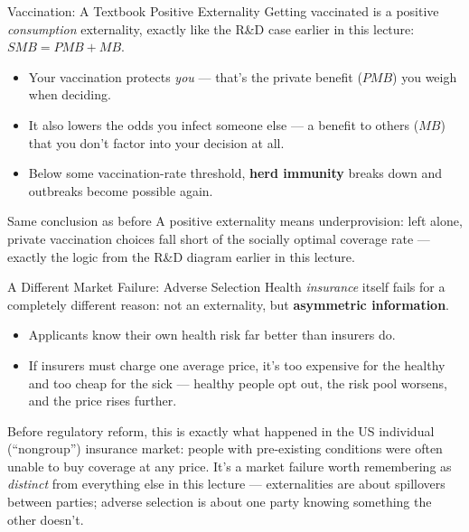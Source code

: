 \documentclass[11pt,aspectratio=169]{beamer}
\begin{document}
\begin{frame}{Vaccination: A Textbook Positive Externality}
  Getting vaccinated is a positive \emph{consumption} externality, exactly like the R\&D case earlier in this lecture: $SMB = PMB + MB$.
  \begin{itemize}
    \item Your vaccination protects \emph{you} --- that's the private benefit ($PMB$) you weigh when deciding.
    \item It also lowers the odds you infect someone else --- a benefit to others ($MB$) that you don't factor into your decision at all.
    \item Below some vaccination-rate threshold, \textbf{herd immunity} breaks down and outbreaks become possible again.
  \end{itemize}
  \vspace{0.4em}
  \begin{alertblock}{Same conclusion as before}
    A positive externality means underprovision: left alone, private vaccination choices fall short of the socially optimal coverage rate --- exactly the logic from the R\&D diagram earlier in this lecture.
  \end{alertblock}
\end{frame}

\begin{frame}{A Different Market Failure: Adverse Selection}
  Health \emph{insurance} itself fails for a completely different reason: not an externality, but \textbf{asymmetric information}.
  \begin{itemize}
    \item Applicants know their own health risk far better than insurers do.
    \item If insurers must charge one average price, it's too expensive for the healthy and too cheap for the sick --- healthy people opt out, the risk pool worsens, and the price rises further.
  \end{itemize}
  \vspace{0.3em}
  \small Before regulatory reform, this is exactly what happened in the US individual (``nongroup'') insurance market: people with pre-existing conditions were often unable to buy coverage at any price. It's a market failure worth remembering as \emph{distinct} from everything else in this lecture --- externalities are about spillovers between parties; adverse selection is about one party knowing something the other doesn't.
\end{frame}
\end{document}
